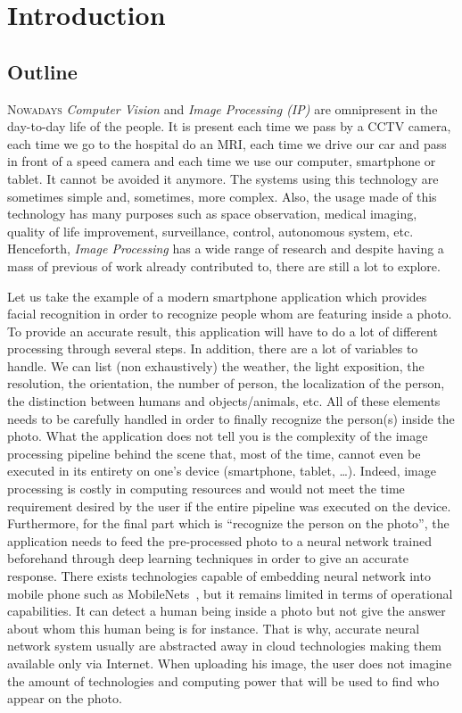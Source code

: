 \chapter{Introduction}
\label{chap:introduction}

\section*{Outline}

\lettrine[lines=2]{N}{owadays} \emph{Computer Vision} and \emph{Image Processing (IP)} are omnipresent in the day-to-day
life of the people. It is present each time we pass by a CCTV camera, each time we go to the hospital do an MRI, each
time we drive our car and pass in front of a speed camera and each time we use our computer, smartphone or tablet. It
cannot be avoided it anymore. The systems using this technology are sometimes simple and, sometimes, more complex. Also,
the usage made of this technology has many purposes such as space observation, medical imaging, quality of life
improvement, surveillance, control, autonomous system, etc. Henceforth, \emph{Image Processing} has a wide range of
research and despite having a mass of previous of work already contributed to, there are still a lot to explore.

Let us take the example of a modern smartphone application which provides facial recognition in order to recognize
people whom are featuring inside a photo. To provide an accurate result, this application will have to do a lot of
different processing through several steps. In addition, there are a lot of variables to handle. We can list (non
exhaustively) the weather, the light exposition, the resolution, the orientation, the number of person, the localization
of the person, the distinction between humans and objects/animals, etc. All of these elements needs to be carefully
handled in order to finally recognize the person(s) inside the photo. What the application does not tell you is the
complexity of the image processing pipeline behind the scene that, most of the time, cannot even be executed in its
entirety on one's device (smartphone, tablet, \ldots). Indeed, image processing is costly in computing resources and
would not meet the time requirement desired by the user if the entire pipeline was executed on the device. Furthermore,
for the final part which is ``recognize the person on the photo'', the application needs to feed the pre-processed photo
to a neural network trained beforehand through deep learning techniques in order to give an accurate response. There
exists technologies capable of embedding neural network into mobile phone such as
MobileNets~\parencite{howard.2017.mobilenets}, but it remains limited in terms of operational capabilities. It can
detect a human being inside a photo but not give the answer about whom this human being is for instance. That is why,
accurate neural network system usually are abstracted away in cloud technologies making them available only via
Internet. When uploading his image, the user does not imagine the amount of technologies and computing power that will
be used to find who appear on the photo.

